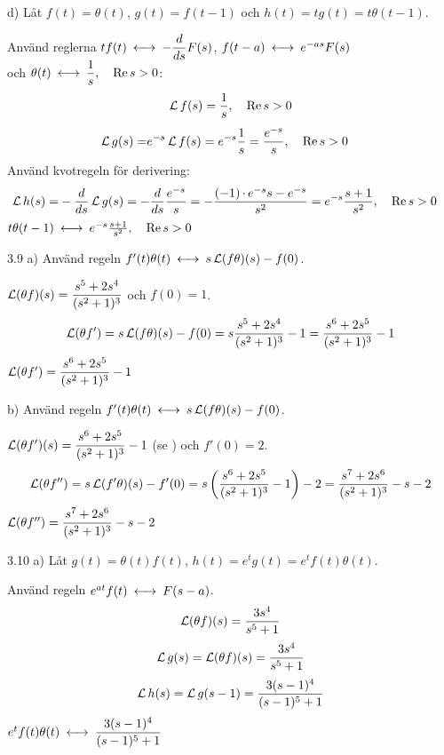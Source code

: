 \begin{task}{d)}
	Låt $f(t)=\theta(t)$, $g(t)=f(t-1)$ och $h(t)=tg(t)=t\theta(t-1)$.
	
	Använd reglerna $tf(t) \llra -\dfrac{d}{ds}F(s)$, $f(t-a)\llra e^{-as}F(s)$ \\
	och $\theta(t)\llra\dfrac{1}{s}\cond{\Re s > 0}$:
	\[\operatorname{\mathcal{L}} f(s)=\frac{1}{s}, \quad \operatorname{Re} s > 0\]
	\begin{align*}
	\operatorname{\mathcal{L}} g(s)=
	&e^{-s}\operatorname{\mathcal{L}} f(s)=
	e^{-s}\frac{1}{s}=
	\frac{e^{-s}}{s}, \quad \operatorname{Re} s > 0
	\end{align*}
	Använd kvotregeln för derivering:
	\begin{align*}
	\operatorname{\mathcal{L}} h(s)=
	&-\frac{d}{ds}\operatorname{\mathcal{L}} g(s)=
	-\frac{d}{ds}\frac{e^{-s}}{s}=
	-\frac{(-1)\operatorname{\cdot}e^{-s}s-e^{-s}}{s^2}=
	e^{-s}\frac{s+1}{s^2}, \quad \operatorname{Re} s > 0
	\end{align*}
	\ans $t\theta(t-1) \llra e^{-s}\frac{s+1}{s^2}\cond{\Re s > 0}$
\end{task}

\begin{task}{3.9 a)}
	Använd regeln $f'(t)\theta(t)\llra s\laplace(f\theta)(s)-f(0)$.
	
	$\operatorname{\mathcal{L}}(\theta f)(s)=\dfrac{s^5+2s^4}{(s^2+1)^3}$ och $f(0)=1$.
	\begin{align*}
	\operatorname{\mathcal{L}}(\theta f')=
	s\operatorname{\mathcal{L}}(f\theta)(s)-f(0)=
	s\frac{s^5+2s^4}{(s^2+1)^3}-1=
	\frac{s^6+2s^5}{(s^2+1)^3}-1
	\end{align*}
	\ans $\operatorname{\mathcal{L}}(\theta f')=\dfrac{s^6+2s^5}{(s^2+1)^3}-1$
\end{task}

\begin{task}{b)}
	Använd regeln $f'(t)\theta(t)\llra s\laplace(f\theta)(s)-f(0)$.
	
	$\operatorname{\mathcal{L}}(\theta f')(s)=\dfrac{s^6+2s^5}{(s^2+1)^3}-1$ (se ) och $f'(0)=2$.
	\begin{align*}
	\operatorname{\mathcal{L}}(\theta f'')=
	s\operatorname{\mathcal{L}}(f'\theta)(s)-f'(0)=
	s\left(\frac{s^6+2s^5}{(s^2+1)^3}-1\right)-2=
	\frac{s^7+2s^6}{(s^2+1)^3}-s-2
	\end{align*}
	\ans $\operatorname{\mathcal{L}}(\theta f'')=\dfrac{s^7+2s^6}{(s^2+1)^3}-s-2$
\end{task}

\begin{task}{3.10 a)}
	Låt $g(t)=\theta(t)f(t)$, $h(t)=e^{t}g(t)=e^{t}f(t)\theta(t)$.
	
	Använd regeln $e^{at}f(t) \llra F(s-a)$.
	\[\operatorname{\mathcal{L}}(\theta f)(s)=\frac{3s^4}{s^5+1}\]
	\begin{align*}
	\operatorname{\mathcal{L}} g(s)=
	\operatorname{\mathcal{L}}(\theta f)(s)=
	\frac{3s^4}{s^5+1}
	\end{align*}
	\begin{align*}
	\operatorname{\mathcal{L}} h(s)=
	\operatorname{\mathcal{L}} g(s-1)=
	\frac{3(s-1)^4}{(s-1)^5+1}
	\end{align*}
	\ans $e^{t}f(t)\theta(t)\llra \dfrac{3(s-1)^4}{(s-1)^5+1}$
\end{task}

